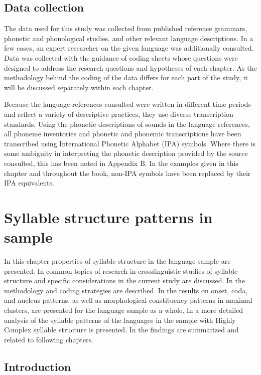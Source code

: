 \section{Data collection}\label{sec:2.5}

  The data used for this study was collected from published reference grammars, phonetic and phonological studies, and other relevant language descriptions. In a few cases, an expert researcher on the given language was additionally consulted. Data was collected with the guidance of coding sheets whose questions were designed to address the research questions and hypotheses of each chapter. As the methodology behind the coding of the data differs for each part of the study, it will be discussed separately within each chapter.

  Because the language references consulted were written in different time periods and reflect a variety of descriptive practices, they use diverse transcription standards. Using the phonetic descriptions of sounds in the language references, all phoneme inventories and phonetic and phonemic transcriptions have been transcribed using International Phonetic Alphabet (IPA) symbols. Where there is some ambiguity in interpreting the phonetic description provided by the source consulted, this has been noted in Appendix B. In the examples given in this chapter and throughout the book, non-IPA symbols have been replaced by their IPA equivalents.

\chapter{Syllable structure patterns in sample}\label{sec:3}

  In this chapter properties of syllable structure in the language sample are presented. In  common topics of research in crosslinguistic studies of syllable structure and specific considerations in the current study are discussed. In  the methodology and coding strategies are described. In  the results on onset, coda, and nucleus patterns, as well as morphological constituency patterns in maximal clusters, are presented for the language sample as a whole. In  a more detailed analysis of the syllable patterns of the languages in the sample with Highly Complex syllable structure is presented. In  the findings are summarized and related to following chapters.

\section{Introduction}\label{sec:3.1}
